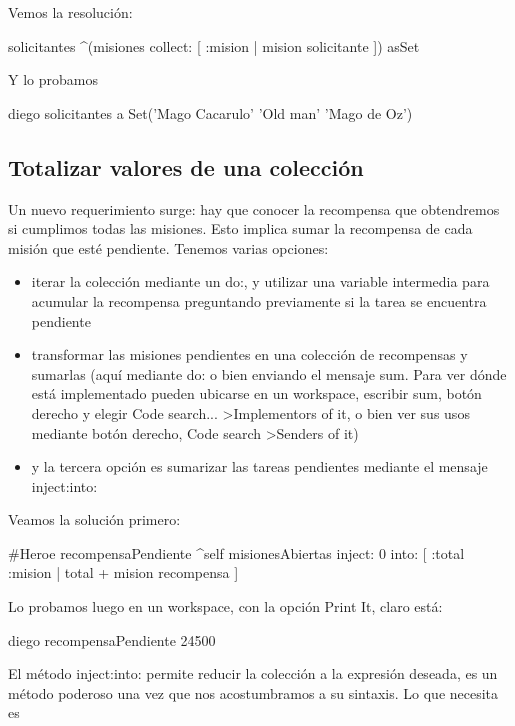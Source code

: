 \documentclass[a4paper,12pt]{book}
\begin{document}
Vemos la resolución:

\begin{code}
solicitantes
   ^(misiones collect: [ :mision | mision solicitante ]) asSet
\end{code}

Y lo probamos 

\begin{code}
diego solicitantes
   a Set('Mago Cacarulo' 'Old man' 'Mago de Oz')
\end{code}

\subsection{Totalizar valores de una colección}
Un nuevo requerimiento surge: hay que conocer la recompensa que obtendremos si cumplimos todas las misiones.
Esto implica sumar la recompensa de cada misión que esté pendiente. Tenemos varias opciones:
\\
\begin{itemize}
 \item iterar la colección mediante un do:, y utilizar una variable intermedia para acumular la recompensa
 preguntando previamente si la tarea se encuentra pendiente
 \item transformar las misiones pendientes en una colección de recompensas y sumarlas (aquí mediante do: o 
 bien enviando el mensaje sum. Para ver dónde está implementado pueden ubicarse en un workspace, escribir sum, 
 botón derecho y elegir Code search... \textgreater Implementors of it, o bien ver sus usos mediante botón derecho,
 Code search \textgreater Senders of it)
 \item y la tercera opción es sumarizar las tareas pendientes mediante el mensaje inject:into:
\end{itemize}

Veamos la solución primero:

\begin{code}
#Heroe
recompensaPendiente
   ^self misionesAbiertas inject: 0 into: [ :total :mision | total + mision recompensa ]
\end{code}

Lo probamos luego en un workspace, con la opción Print It, claro está:

\begin{code}
diego recompensaPendiente
  24500
\end{code}

El método inject:into: permite reducir la colección a la expresión deseada, es un método poderoso una vez que
nos acostumbramos a su sintaxis. Lo que necesita es
\end{document}
